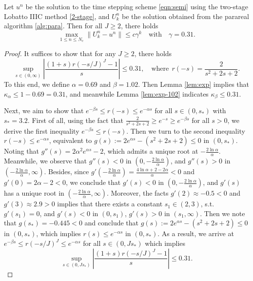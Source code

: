 \begin{proposition}\label{prop:lobatto-2}
Let $u^n$ be the solution to the time stepping scheme \eqref{eqn:semi} using
the two-stage Lobatto IIIC method \eqref{2-stage},
and $U_k^n$ be the solution obtained from the parareal algorithm \ref{alg:para}. Then for all $J\ge 2$, there holds
$$ \max_{1 \le n\le N_c} \| U_k^n - u^n \|  \le c \gamma^k\quad \text{with} \quad \gamma=0.31.$$
\end{proposition}

\begin{proof}
It suffices to show that for any $J\ge 2$, there holds
\begin{equation}\label{eqn:lobatto-2}
    \sup_{s\in(0,\infty)}  \left|\frac{(1+s) r(-s/J)^J-1}{s}\right| \le 0.31,
    \quad
    \text{where}~~ r(-s) = \frac{2}{s^2+2s+2}.
\end{equation}
To this end, we define $\alpha = 0.69$ and $\beta=1.02$.
Then Lemma \ref{lem:exp} implies that
$\kappa_\alpha \le 1-0.69 = 0.31$,
and meanwhile Lemma \ref{lem:exp-102} indicates $\kappa_\beta \le 0.31$.

Next, we aim to show that $e^{-\beta s} \le r(-s) \le e^{-\alpha s}$ for all $s\in(0,s_*)$ with $s_*=3.2$. First of all, using the fact that
$\frac{2}{s^2+2s+2} \ge {e^{-s}} \ge e^{-\beta s}$ for all $s > 0$, we derive
the first inequality $e^{-\beta s} \le r(-s)$.
Then we turn to the second inequality
$r(-s) \le e^{-\alpha s}$, equivalent to
$g(s) := 2e^{\alpha s} -(s^2+2s+2) \le 0$ in  $(0, s_*)$.
Noting that $g''(s) = 2\alpha^2 e^{\alpha s} - 2$, which admits a
unique root at $-\frac{2\ln \alpha}{\alpha}$.
Meanwhile, we observe that
$g''(s) <0$ in $(0, -\frac{2\ln \alpha}{\alpha})$,
and $g''(s) >0$ in $( -\frac{2\ln \alpha}{\alpha}, \infty)$.
Besides, since $g'\left( -\frac{2\ln \alpha}{\alpha}\right)  =
\frac{4\ln \alpha +2-2\alpha}{\alpha}<0$
and $g'(0)=2\alpha-2 <0$, we conclude that
$g'(s) < 0$ in $(0, -\frac{2\ln \alpha}{\alpha})$,
and $g'(s)$ has a unique root in $(-\frac{2\ln \alpha}{\alpha}, \infty)$. Moreover, the facts $g'(2) \approx -0.5 <0$ and $g'(3) \approx 2.9 >0$ implies that
there exists a constant $s_1 \in (2,3)$, s.t. $g'(s_1)= 0$,
and $g'(s) <0$ in $(0, s_1)$,
$g'(s) >0$ in $(s_1, \infty)$.
Then we note that $g(s_*) = -0.445 <0$ and conclude that
$g(s) := 2e^{\alpha s} -(s^2+2s+2) \le 0$ in  $(0, s_*)$,
which implies $r(s) \le e^{-\alpha s}$ in $(0, s_*)$.
As a result, we arrive at $e^{-\beta s} \le r(-s/J)^J \le e^{-\alpha s}$
for all $s\in(0, J s_*)$ which  implies
\begin{equation*}
    \sup_{s\in(0, J s_*)}
    \left|\frac{(1+s) r(-s/J)^J-1}{s}\right| \le 0.31.
\end{equation*}


\end{proof}
